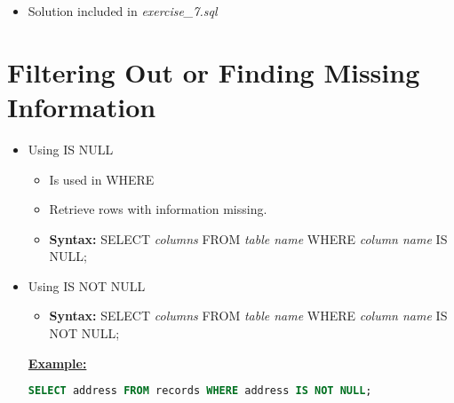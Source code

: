 \documentclass[12pt]{article}
\begin{document}
\bigskip

\begin{itemize}
    \item Solution included in \textit{exercise\_7.sql}
\end{itemize}

\bigskip

\section{Filtering Out or Finding Missing Information}

\bigskip

\begin{itemize}
    \item Using IS NULL
    \begin{itemize}
        \item Is used in WHERE
        \item Retrieve rows with information missing.
        \item \textbf{Syntax:} SELECT \textit{columns} FROM \textit{table name} WHERE \textit{column name} IS NULL;
    \end{itemize}
    \item Using IS NOT NULL
    \begin{itemize}
        \item \textbf{Syntax:} SELECT \textit{columns} FROM \textit{table name} WHERE \textit{column name} IS NOT NULL;
    \end{itemize}

    \bigskip

    \underline{\textbf{Example:}}

    \bigskip

    \begin{lstlisting}[language=SQL]
    SELECT address FROM records WHERE address IS NOT NULL;
    \end{lstlisting}
\end{itemize}
\end{document}
